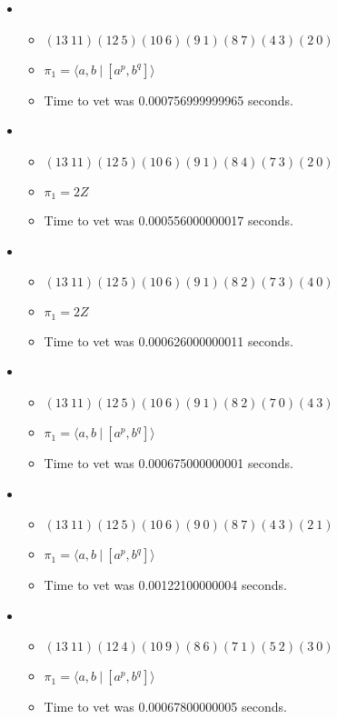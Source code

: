 \documentclass{article}
\begin{document}
\begin{itemize}
\begin{itemize}
\end{itemize}
\item \begin{itemize}
      \item $(13\ 11)(12\ 5)(10\ 6)(9\ 1)(8\ 7)(4\ 3)(2\ 0)$
      \item $\pi_1 = \langle a,b\ |\ [a^p,b^q]\rangle$
      \item Time to vet was 0.000756999999965 seconds.
\end{itemize}
\item \begin{itemize}
      \item $(13\ 11)(12\ 5)(10\ 6)(9\ 1)(8\ 4)(7\ 3)(2\ 0)$
      \item $\pi_1 =2 Z$
      \item Time to vet was 0.000556000000017 seconds.
\end{itemize}
\item \begin{itemize}
      \item $(13\ 11)(12\ 5)(10\ 6)(9\ 1)(8\ 2)(7\ 3)(4\ 0)$
      \item $\pi_1 =2 Z$
      \item Time to vet was 0.000626000000011 seconds.
\end{itemize}
\item \begin{itemize}
      \item $(13\ 11)(12\ 5)(10\ 6)(9\ 1)(8\ 2)(7\ 0)(4\ 3)$
      \item $\pi_1 = \langle a,b\ |\ [a^p,b^q]\rangle$
      \item Time to vet was 0.000675000000001 seconds.
\end{itemize}
\item \begin{itemize}
      \item $(13\ 11)(12\ 5)(10\ 6)(9\ 0)(8\ 7)(4\ 3)(2\ 1)$
      \item $\pi_1 = \langle a,b\ |\ [a^p,b^q]\rangle$
      \item Time to vet was 0.00122100000004 seconds.
\end{itemize}
\item \begin{itemize}
      \item $(13\ 11)(12\ 4)(10\ 9)(8\ 6)(7\ 1)(5\ 2)(3\ 0)$
      \item $\pi_1 = \langle a,b\ |\ [a^p,b^q]\rangle$
      \item Time to vet was 0.00067800000005 seconds.

\end{itemize}
\end{itemize}
\end{document}
